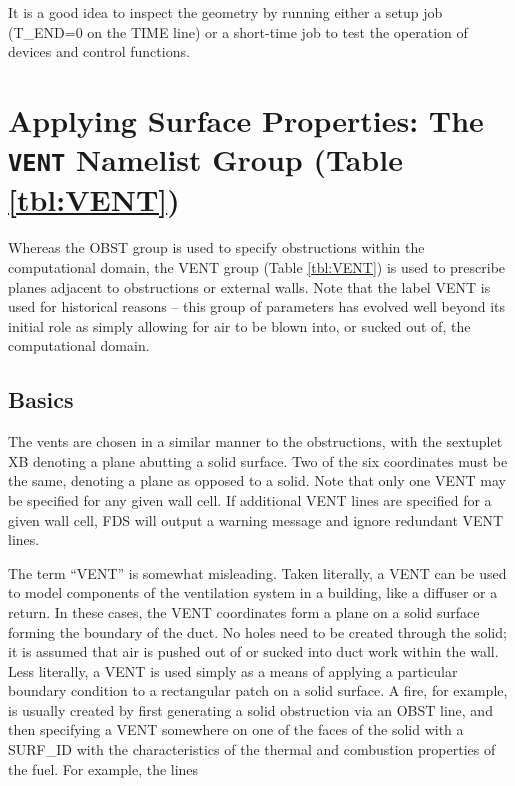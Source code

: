 \documentclass[11pt]{book}
\begin{document}
It is a good idea to inspect the geometry by running either a setup job
({\ct T\_END=0} on the {\ct TIME} line) or a short-time job to test the operation of devices and control functions.





\section{Applying Surface Properties: The \texorpdfstring{{\tt VENT}}{VENT} Namelist Group (Table \ref{tbl:VENT})}
\label{info:VENT}

Whereas the {\ct OBST} group is used to specify obstructions within the
computational domain, the {\ct VENT} group (Table \ref{tbl:VENT}) is used to prescribe planes
adjacent to obstructions or external walls. Note that the label {\ct VENT} is used for historical reasons -- this group of parameters has
evolved well beyond its initial role as simply allowing for air to be blown into, or sucked out of, the computational domain.

\subsection{Basics}

\label{info:VENT_Basics}

The vents are chosen in a similar manner to the obstructions, with the sextuplet {\ct XB} denoting a plane abutting a solid surface. Two of the six coordinates must be the same, denoting a plane as opposed to a solid. Note that only one {\ct VENT} may be specified for any given wall cell.  If additional {\ct VENT} lines are specified for a given wall cell, FDS will output a warning message and ignore redundant {\ct VENT} lines.

The term ``{\ct VENT}'' is somewhat misleading. Taken literally, a
{\ct VENT} can be used to model components of the ventilation system in
a building, like a diffuser or a return.
In these cases, the {\ct VENT} coordinates form a plane on a
solid surface forming the boundary of the duct.
No holes need to be created through the solid; it is
assumed that air is pushed out of or sucked into duct work within the
wall. Less literally, a {\ct VENT} is used simply as a means of applying
a particular boundary condition to a rectangular patch on a solid surface.
A fire, for example, is usually created by first generating a solid
obstruction via an {\ct OBST} line, and then specifying a {\ct VENT}
somewhere on one of the faces of the solid with a {\ct SURF\_ID}
with the characteristics of the thermal and combustion properties of the fuel.
For example, the lines
\end{document}

